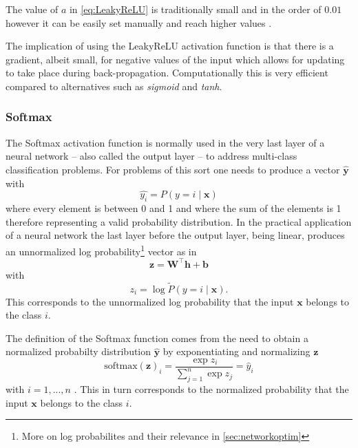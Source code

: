 The value of $a$ in \cref{eq:LeakyReLU} is traditionally small and in the order of $0.01$ however it can be easily set manually and reach higher values \citep{Xu2015EmpiricalNetwork}. 

The implication of using the LeakyReLU activation function is that there is a gradient, albeit small, for negative values of the input which allows for updating to take place during back-propagation. Computationally this is very efficient compared to alternatives such as \textit{sigmoid} and \textit{tanh}.

\subsubsection{Softmax} \label{sec:softmax}

The Softmax activation function is normally used in the very last layer of a neural network -- also called the output layer -- to address multi-class classification problems. For problems of this sort one needs to produce a vector $\hat{\bm{y}}$ with
\begin{equation}
    \hat{y_i} = P(y=i\mid \bm{x})
\end{equation}
where every element is between 0 and 1 and where the sum of the elements is 1 therefore representing a valid probability distribution. In the practical application of a neural network the last layer before the output layer, being linear, produces an unnormalized log probability\footnote{More on log probabilites and their relevance in \cref{sec:networkoptim}} vector as in
\begin{equation}
    \bm{z} = \bm{W}^\top \bm{h} + \bm{b}
\end{equation}
with
\begin{equation}
    z_i = \log \tilde{P}(y=i \mid \bm{x}).
\end{equation} This corresponds to the unnormalized log probability that the input $\bm{x}$ belongs to the class $i$.

The definition of the Softmax function comes from the need to obtain a normalized probabilty distribution $\hat{\bm{y}}$ by exponentiating and normalizing $\bm{z}$
\begin{equation} \label{eq:softmax}
    \text{softmax}(\bm{z})_i=\dfrac{\exp{z_i}}{\sum_{j=1}^n \exp{z_j}} = \hat{y}_i
\end{equation}
with $i=1,...,n$ \citep{Goodfellow2016}.
This in turn corresponds to the normalized probability that the input $\bm{x}$ belongs to the class $i$.

